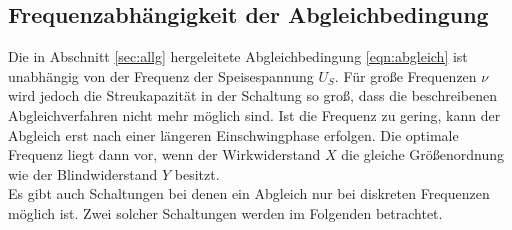 \subsection{Frequenzabhängigkeit der Abgleichbedingung}
\label{sec:frequenzabhängig}
Die in Abschnitt \ref{sec:allg} hergeleitete Abgleichbedingung \eqref{eqn:abgleich} ist unabhängig von der Frequenz der Speisespannung $U_S$.
Für große Frequenzen $\nu$ wird jedoch die Streukapazität in der Schaltung so groß, dass die beschreibenen Abgleichverfahren nicht mehr 
möglich sind. Ist die Frequenz zu gering, kann der Abgleich erst nach einer längeren Einschwingphase erfolgen. Die optimale Frequenz liegt 
dann vor, wenn der Wirkwiderstand $X$ die gleiche Größenordnung wie der Blindwiderstand $Y$ besitzt.
\\\noindent 
Es gibt auch Schaltungen bei denen ein Abgleich nur bei diskreten Frequenzen möglich ist. Zwei solcher Schaltungen werden im Folgenden
betrachtet.  

